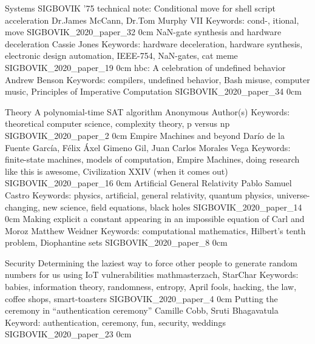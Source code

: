 \addtrack
	{}{Systems}
\addpaper
	{SIGBOVIK '75 technical note: Conditional move for shell script acceleration}
	{Dr.\@ James McCann, Dr.\@ Tom Murphy VII}
	{Keywords: cond-, itional, move}
	{SIGBOVIK_2020_paper_32}
	{0cm}
	{}
\addpaper
	{NaN-gate synthesis and hardware deceleration}
	{Cassie Jones}
	{Keywords: hardware deceleration, hardware synthesis, electronic design automation, IEEE-754, NaN-gates, cat meme}
	{SIGBOVIK_2020_paper_19}
	{0cm}
	{}
\addpaper
	{hbc: A celebration of undefined behavior}
	{Andrew Benson}
	{Keywords: compilers, undefined behavior, Bash misuse, computer music, Principles of Imperative Computation}
	{SIGBOVIK_2020_paper_34}
	{0cm}
	{}

\addtrack
	{}{Theory}
\addpaper
	{A polynomial-time SAT algorithm}
	{Anonymous Author(s)}
	{Keywords: theoretical computer science, complexity theory, p versus np}
	{SIGBOVIK_2020_paper_2}
	{0cm}
	{}
\addpaper
	{Empire Machines and beyond}
	{Dar\'io de la Fuente Garc\'ia, F\'elix \'Axel Gimeno Gil, Juan Carlos Morales Vega}
	{Keywords: finite-state machines, models of computation, Empire Machines, doing research like this is awesome, Civilization XXIV (when it comes out)}
	{SIGBOVIK_2020_paper_16}
	{0cm}
	{}
\addpaper
	{Artificial General Relativity}
	{Pablo Samuel Castro}
	{Keywords: physics, artificial, general relativity, quantum physics, universe-changing, new science, field equations, black holes}
	{SIGBOVIK_2020_paper_14}
	{0cm}
	{}
\addpaper
	{Making explicit a constant appearing in an impossible equation of Carl and Moroz}
	{Matthew Weidner}
	{Keywords: computational mathematics, Hilbert's tenth problem, Diophantine sets}
	{SIGBOVIK_2020_paper_8}
	{0cm}
	{}

\addtrack
	{}{Security}
\addpaper
	{Determining the laziest way to force other people to generate random numbers for us using IoT vulnerabilities}
	{mathmasterzach, StarChar}
	{Keywords: babies, information theory, randomness, entropy, April fools, hacking, the law, coffee shops, smart-toasters}
	{SIGBOVIK_2020_paper_4}
	{0cm}
	{}
\setcounter{egap}{\thepage}
\setcounter{page}{1}
\setcounter{page}{\theegap}
\addpaper
	{Putting the ceremony in ``authentication ceremony''}
	{Camille Cobb, Sruti Bhagavatula}
	{Keyword: authentication, ceremony, fun, security, weddings}
	{SIGBOVIK_2020_paper_23}
	{0cm}
	{}

